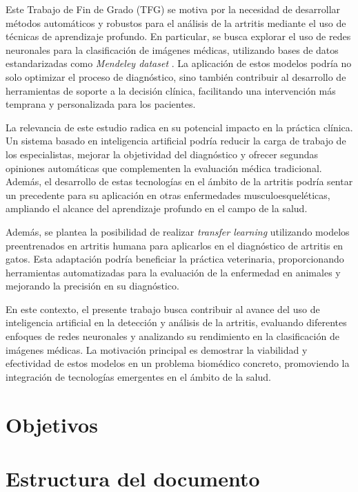 \documentclass[11pt,spanish,listoffigures,listoftables]{tfgetsinf}
\begin{document}
Este Trabajo de Fin de Grado (TFG) se motiva por la necesidad de desarrollar métodos automáticos y robustos para el análisis de la artritis mediante el uso de técnicas de aprendizaje profundo. En particular, se busca explorar el uso de redes neuronales para la clasificación de imágenes médicas, utilizando bases de datos estandarizadas como \textit{Mendeley dataset} \cite{chen2018knee}. La aplicación de estos modelos podría no solo optimizar el proceso de diagnóstico, sino también contribuir al desarrollo de herramientas de soporte a la decisión clínica, facilitando una intervención más temprana y personalizada para los pacientes.

La relevancia de este estudio radica en su potencial impacto en la práctica clínica. Un sistema basado en inteligencia artificial podría reducir la carga de trabajo de los especialistas, mejorar la objetividad del diagnóstico y ofrecer segundas opiniones automáticas que complementen la evaluación médica tradicional. Además, el desarrollo de estas tecnologías en el ámbito de la artritis podría sentar un precedente para su aplicación en otras enfermedades musculoesqueléticas, ampliando el alcance del aprendizaje profundo en el campo de la salud.

Además, se plantea la posibilidad de realizar \textit{transfer learning} utilizando modelos preentrenados en artritis humana para aplicarlos en el diagnóstico de artritis en gatos. Esta adaptación podría beneficiar la práctica veterinaria, proporcionando herramientas automatizadas para la evaluación de la enfermedad en animales y mejorando la precisión en su diagnóstico.

En este contexto, el presente trabajo busca contribuir al avance del uso de inteligencia artificial en la detección y análisis de la artritis, evaluando diferentes enfoques de redes neuronales y analizando su rendimiento en la clasificación de imágenes médicas. La motivación principal es demostrar la viabilidad y efectividad de estos modelos en un problema biomédico concreto, promoviendo la integración de tecnologías emergentes en el ámbito de la salud.


\section{Objetivos}      %

\section{Estructura del documento}  %
\end{document}
